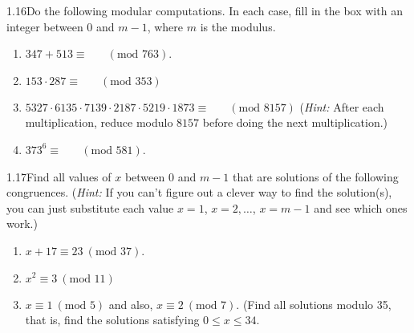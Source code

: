 \begin{exercise}
    {1.16}Do the following modular computations. In each case, fill in the box with an integer between 0 and $m - 1$, where $m$ is the modulus.
    \begin{enumerate}
        \item $347 + 513 \equiv \boxed{\phantom{000}} \ (\text{mod } 763)$.
        \setcounter{enumi}{2}
        \item $153 \cdot 287 \equiv \boxed{\phantom{000}} \ (\text{mod } 353)$
        \setcounter{enumi}{4}
        \item $5327 \cdot 6135 \cdot 7139 \cdot 2187 \cdot 5219 \cdot 1873 \equiv \boxed{\phantom{000}} \ (\text{mod } 8157)$ (\textit{Hint:} After each multiplication, reduce modulo $8157$ before doing the next multiplication.)
        \setcounter{enumi}{6}
        \item $373^6 \equiv \boxed{\phantom{000}} \ (\text{mod } 581)$.
    \end{enumerate}
\end{exercise}


\begin{exercise}
    {1.17}Find all values of $x$ between $0$ and $m - 1$ that are solutions of the following congruences. (\textit{Hint:} If you can't figure out a clever way to find the solution(s), you can just substitute each value $x = 1$, $x = 2,\dots$, $x = m - 1$ and see which ones work.)
    \begin{enumerate}
        \item $x + 17 \equiv 23 \ (\text{mod } 37)$.
        \setcounter{enumi}{2}
        \item $x^2 \equiv 3 \ (\text{mod } 11)$
        \setcounter{enumi}{6}
        \item $x \equiv 1 \ (\text{mod } 5)$ and also, $x \equiv 2 \ (\text{mod } 7)$. (Find all solutions modulo 35, that is, find the solutions satisfying $0 \leq x \leq 34$.
    \end{enumerate}
\end{exercise}

